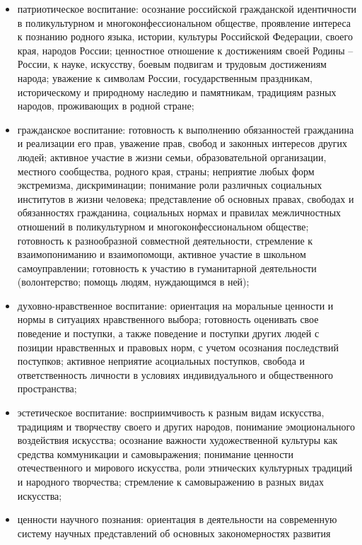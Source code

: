 \documentclass[
  11pt,
  russian,
]{book}
\begin{document}
\begin{itemize}
\item
  патриотическое воспитание: осознание российской гражданской
  идентичности в поликультурном и многоконфессиональном обществе,
  проявление интереса к познанию родного языка, истории, культуры
  Российской Федерации, своего края, народов России; ценностное
  отношение к достижениям своей Родины -- России, к науке, искусству,
  боевым подвигам и трудовым достижениям народа; уважение к символам
  России, государственным праздникам, историческому и природному
  наследию и памятникам, традициям разных народов, проживающих в родной
  стране;
\item
  гражданское воспитание: готовность к выполнению обязанностей
  гражданина и реализации его прав, уважение прав, свобод и законных
  интересов других людей; активное участие в жизни семьи,
  образовательной организации, местного сообщества, родного края,
  страны; неприятие любых форм экстремизма, дискриминации; понимание
  роли различных социальных институтов в жизни человека; представление
  об основных правах, свободах и обязанностях гражданина, социальных
  нормах и правилах межличностных отношений в поликультурном и
  многоконфессиональном обществе; готовность к разнообразной совместной
  деятельности, стремление к взаимопониманию и взаимопомощи, активное
  участие в школьном самоуправлении; готовность к участию в гуманитарной
  деятельности (волонтерство; помощь людям, нуждающимся в ней);
\item
  духовно-нравственное воспитание: ориентация на моральные ценности и
  нормы в ситуациях нравственного выбора; готовность оценивать свое
  поведение и поступки, а также поведение и поступки других людей с
  позиции нравственных и правовых норм, с учетом осознания последствий
  поступков; активное неприятие асоциальных поступков, свобода и
  ответственность личности в условиях индивидуального и общественного
  пространства;
\item
  эстетическое воспитание: восприимчивость к разным видам искусства,
  традициям и творчеству своего и других народов, понимание
  эмоционального воздействия искусства; осознание важности
  художественной культуры как средства коммуникации и самовыражения;
  понимание ценности отечественного и мирового искусства, роли
  этнических культурных традиций и народного творчества; стремление к
  самовыражению в разных видах искусства;
\item
  ценности научного познания: ориентация в деятельности на современную
  систему научных представлений об основных закономерностях развития

\end{itemize}
\end{document}
